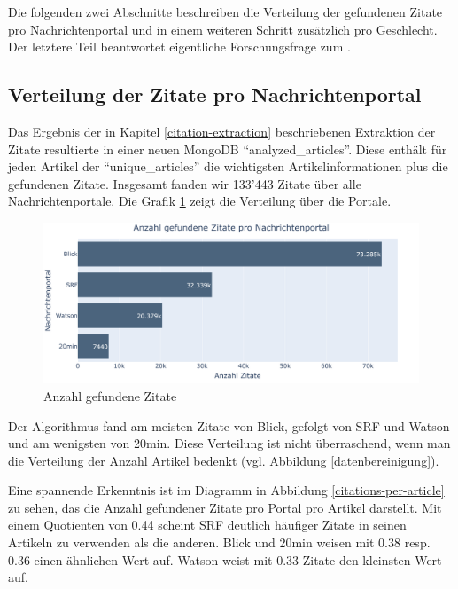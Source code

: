 Die folgenden zwei Abschnitte beschreiben die Verteilung der gefundenen Zitate pro
Nachrichtenportal und in einem weiteren Schritt zusätzlich pro Geschlecht. Der letztere Teil
beantwortet eigentliche Forschungsfrage zum .

\subsection{Verteilung der Zitate pro Nachrichtenportal}

Das Ergebnis der in Kapitel \ref{citation-extraction} beschriebenen Extraktion der Zitate
resultierte in einer neuen MongoDB  \enquote{analyzed\_articles}. Diese enthält
für jeden Artikel der  \enquote{unique\_articles} die wichtigsten Artikelinformationen
plus die gefundenen Zitate. Insgesamt fanden wir 133'443 Zitate über alle
Nachrichtenportale. Die Grafik \ref{count-citations-per-portal} zeigt die Verteilung über die
Portale.

\begin{figure}[H]
	\begin{center}
        \centering
		\includegraphics[width=1\linewidth]{./images/plot_anzahl_zitate_pro_portal.PNG}
		\caption{Anzahl gefundene Zitate}
		\label{count-citations-per-portal}
	\end{center}
\end{figure}

Der Algorithmus fand am meisten Zitate von Blick, gefolgt von SRF und Watson und am wenigsten
von 20min. Diese Verteilung ist nicht überraschend, wenn man die Verteilung der Anzahl Artikel bedenkt (vgl. Abbildung \ref{datenbereinigung}).

Eine spannende Erkenntnis ist im Diagramm in Abbildung \ref{citations-per-article} zu sehen,
das die Anzahl gefundener Zitate pro Portal pro Artikel darstellt. Mit einem Quotienten von
0.44 scheint SRF deutlich häufiger Zitate in seinen Artikeln zu verwenden als die anderen. Blick und 20min weisen
mit 0.38 resp. 0.36 einen ähnlichen Wert auf. Watson weist mit 0.33 Zitate den kleinsten Wert auf.

